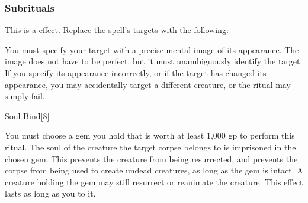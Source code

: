 \subsubsection{Subrituals}
This is a  effect.
Replace the spell's targets with the following:
\begin{spellcontent}
\begin{augmenttargetinginfo}
\spellspecial
You must specify your target with a precise mental image of its appearance.
The image does not have to be perfect, but it must unambiguously identify the target.
If you specify its appearance incorrectly, or if the target has changed its appearance, you may accidentally target a different creature, or the ritual may simply fail.
\end{augmenttargetinginfo}
\end{spellcontent}
\begin{spellsection}{Soul Bind}[8]
\begin{spellcontent}
\begin{spelltargetinginfo}
\end{spelltargetinginfo}
\begin{spelleffects}
\spellspecial
You must choose a gem you hold that is worth at least 1,000 gp to perform this ritual.
\spelleffect
The soul of the creature the target corpse belongs to is imprisoned in the chosen gem.
This prevents the creature from being resurrected, and prevents the corpse from being used to create undead creatures, as long as the gem is intact.
A creature holding the gem may still resurrect or reanimate the creature.
This effect lasts as long as you  to it.
\end{spelleffects}
\end{spellcontent}
\begin{spellfooter}
\end{spellfooter}
\begin{spellsubcontent}
\end{spellsubcontent}
\end{spellsection}
